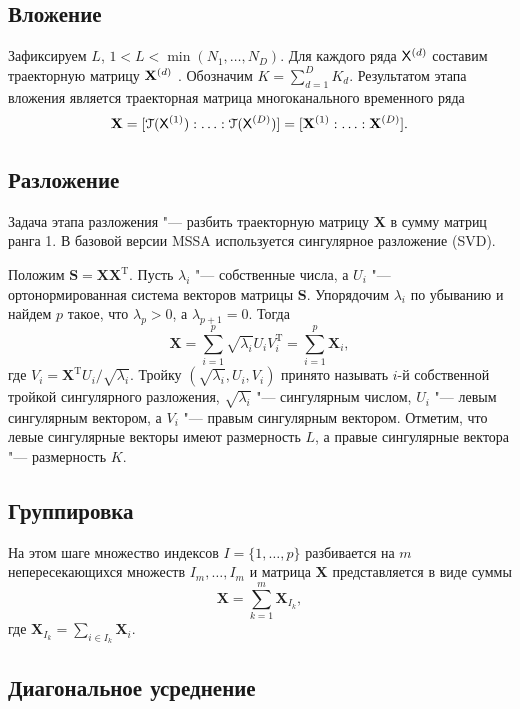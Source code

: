 \documentclass[specialist,
substylefile = spbu_report.rtx,
subf,href,colorlinks=true, 12pt]{disser}
\newcommand{\traj}{\mathbf{X}}
\newcommand{\transponse}{^\mathrm{T}}
\theoremstyle{definition}
\begin{document}
	\subsection{Вложение}\label{sect:embedding}
	Зафиксируем $L$, $1<L<\min(N_1,\ldots,N_D)$. Для каждого ряда $\mathsf{X}^{(d)}$ составим траекторную матрицу $\mathbf{X}^{(d)}$ . Обозначим $K=\sum_{d=1}^D K_d$. Результатом этапа вложения является траекторная матрица многоканального временного ряда
	\begin{equation}\label{eq:traj}
		\bfX=[\cT(\tX^{(1)}):\ldots:\cT(\tX^{(D)})]=[\traj^{(1)}:\ldots:\traj^{(D)}].
	\end{equation}
	\subsection{Разложение}
	Задача этапа разложения "--- разбить траекторную матрицу $\traj$ в сумму матриц ранга 1. В базовой версии MSSA используется сингулярное разложение (SVD).
	
	Положим $\mathbf{S}=\traj\traj\transponse$. Пусть $\lambda_i$ "--- собственные числа, а $U_i$ "--- ортонормированная система векторов матрицы $\mathbf{S}$. Упорядочим $\lambda_i$ по убыванию и найдем $p$ такое, что $\lambda_p>0$, а $\lambda_{p+1}=0$. Тогда
	\[
	\traj=\sum_{i=1}^p\sqrt{\lambda_i}U_iV_i\transponse=\sum_{i=1}^p\traj_i,
	\] 
	где $V_i=\traj\transponse U_i/\sqrt{\lambda_i}$. Тройку $(\sqrt{\lambda_i}, U_i, V_i)$ принято называть $i$-й собственной тройкой сингулярного разложения, $\sqrt{\lambda_i}$ "--- сингулярным числом, $U_i$ "--- левым сингулярным вектором, а $V_i$ "--- правым сингулярным вектором. Отметим, что левые сингулярные векторы имеют размерность $L$, а правые сингулярные вектора "--- размерность $K$. 
	\subsection{Группировка}\label{sect:grouping}
	На этом шаге множество индексов $I=\{1,\ldots,p\}$ разбивается на $m$ непересекающихся множеств $I_m,\ldots,I_m$ и матрица $\traj$ представляется в виде суммы
	\[
	\traj = \sum_{k=1}^m \traj_{I_k},
	\]
	где $\traj_{I_k}=\sum_{i\in I_k}\traj_i$.
	\subsection{Диагональное усреднение}\label{sect:averaging}
	
	
	
	
	
	
	
\end{document}
